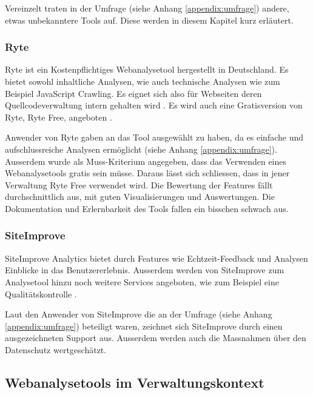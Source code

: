 Vereinzelt traten in der Umfrage (siehe Anhang \ref{appendix:umfrage}) andere, etwas unbekanntere Tools auf. Diese werden in diesem Kapitel kurz erläutert. 

\subsubsection{Ryte}

Ryte ist ein Kostenpflichtiges Webanalysetool hergestellt in Deutschland. Es bietet sowohl inhaltliche Analysen, wie auch technische Analysen wie zum Beispiel JavaScript Crawling. Es eignet sich also für Webseiten deren Quellcodeverwaltung intern gehalten wird \parencite{RyteFeatures}. Es wird auch eine Gratisversion von Ryte, Ryte Free, angeboten \parencite{RyteFree}.

Anwender von Ryte gaben an das Tool ausgewählt zu haben, da es einfache und aufschlussreiche Analysen ermöglicht (siehe Anhang \ref{appendix:umfrage}). Ausserdem wurde als Muss-Kriterium angegeben, dass das Verwenden eines Webanalysetools gratis sein müsse. Daraus lässt sich schliessen, dass in jener Verwaltung Ryte Free verwendet wird. Die Bewertung der Features fällt durchschnittlich aus, mit guten Visualisierungen und Auswertungen. Die Dokumentation und Erlernbarkeit des Tools fallen ein bisschen schwach aus. 

\subsubsection{SiteImprove}

SiteImprove Analytics bietet durch Features wie Echtzeit-Feedback und Analysen Einblicke in das Benutzererlebnis. Ausserdem werden von SiteImprove zum Analysetool hinzu noch weitere Services angeboten, wie zum Beispiel eine Qualitätskontrolle \parencite{SiteimproveFeatures}.

Laut den Anwender von SiteImprove die an der Umfrage (siehe Anhang \ref{appendix:umfrage}) beteiligt waren, zeichnet sich SiteImprove durch einen ausgezeichneten Support aus. Ausserdem werden auch die Massnahmen über den Datenschutz wertgeschätzt.


\subsection{Webanalysetools im Verwaltungskontext}

